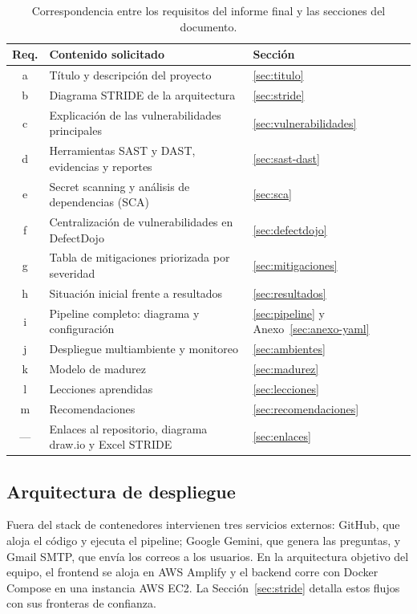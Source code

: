 \documentclass[12pt,a4paper]{article}
\begin{document}
\begin{table}[htbp]
  \centering
  \caption{Correspondencia entre los requisitos del informe final y las secciones del documento.}
  \label{tab:rubrica}
  \small
  \begin{tabularx}{\textwidth}{cYl}
    \toprule
    \textbf{Req.} & \textbf{Contenido solicitado} & \textbf{Sección} \\
    \midrule
    a & Título y descripción del proyecto & \ref{sec:titulo} \\
    b & Diagrama STRIDE de la arquitectura & \ref{sec:stride} \\
    c & Explicación de las vulnerabilidades principales & \ref{sec:vulnerabilidades} \\
    d & Herramientas SAST y DAST, evidencias y reportes & \ref{sec:sast-dast} \\
    e & Secret scanning y análisis de dependencias (SCA) & \ref{sec:sca} \\
    f & Centralización de vulnerabilidades en DefectDojo & \ref{sec:defectdojo} \\
    g & Tabla de mitigaciones priorizada por severidad & \ref{sec:mitigaciones} \\
    h & Situación inicial frente a resultados & \ref{sec:resultados} \\
    i & Pipeline completo: diagrama y configuración & \ref{sec:pipeline} y Anexo~\ref{sec:anexo-yaml} \\
    j & Despliegue multiambiente y monitoreo & \ref{sec:ambientes} \\
    k & Modelo de madurez & \ref{sec:madurez} \\
    l & Lecciones aprendidas & \ref{sec:lecciones} \\
    m & Recomendaciones & \ref{sec:recomendaciones} \\
    --- & Enlaces al repositorio, diagrama draw.io y Excel STRIDE & \ref{sec:enlaces} \\
    \bottomrule
  \end{tabularx}
\end{table}

\subsection{Arquitectura de despliegue}

Fuera del stack de contenedores intervienen tres servicios externos: GitHub, que aloja el código y
ejecuta el pipeline; Google Gemini, que genera las preguntas, y Gmail SMTP, que envía los correos a
los usuarios. En la arquitectura objetivo del equipo, el frontend se aloja en AWS Amplify y el
backend corre con Docker Compose en una instancia AWS EC2. La Sección~\ref{sec:stride} detalla estos
flujos con sus fronteras de confianza.
\end{document}
